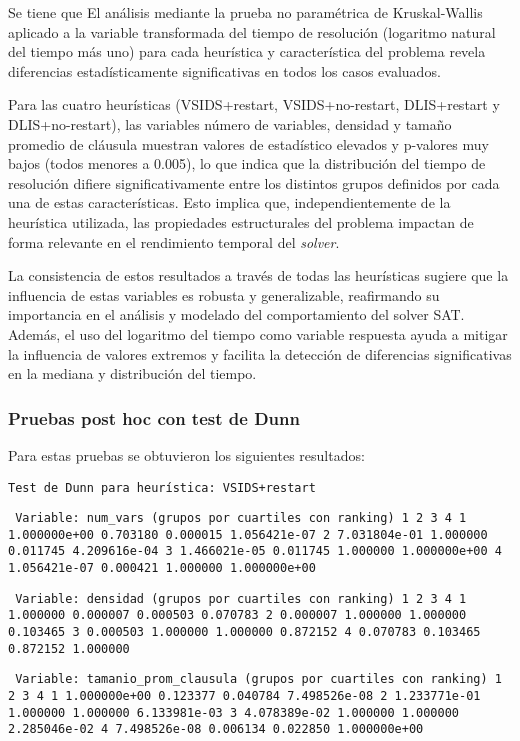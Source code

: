 Se tiene que El análisis mediante la prueba no paramétrica de Kruskal-Wallis aplicado a la variable transformada del tiempo de resolución (logaritmo natural del tiempo más uno) para cada heurística y característica del problema revela diferencias estadísticamente significativas en todos los casos evaluados.

Para las cuatro heurísticas (VSIDS+restart, VSIDS+no-restart, DLIS+restart y DLIS+no-restart), las variables número de variables, densidad y tamaño promedio de cláusula muestran valores de estadístico elevados y p-valores muy bajos (todos menores a 0.005), lo que indica que la distribución del tiempo de resolución difiere significativamente entre los distintos grupos definidos por cada una de estas características. Esto implica que, independientemente de la heurística utilizada, las propiedades estructurales del problema impactan de forma relevante en el rendimiento temporal del \textit{solver}.

La consistencia de estos resultados a través de todas las heurísticas sugiere que la influencia de estas variables es robusta y generalizable, reafirmando su importancia en el análisis y modelado del comportamiento del solver SAT. Además, el uso del logaritmo del tiempo como variable respuesta ayuda a mitigar la influencia de valores extremos y facilita la detección de diferencias significativas en la mediana y distribución del tiempo. 

\subsubsection{Pruebas post hoc con test de Dunn}

Para estas pruebas se obtuvieron los siguientes resultados:

\texttt{Test de Dunn para heurística: VSIDS+restart}

\texttt{
Variable: num\_vars (grupos por cuartiles con ranking)
              1         2         3             4
1  1.000000e+00  0.703180  0.000015  1.056421e-07
2  7.031804e-01  1.000000  0.011745  4.209616e-04
3  1.466021e-05  0.011745  1.000000  1.000000e+00
4  1.056421e-07  0.000421  1.000000  1.000000e+00}

\texttt{
Variable: densidad (grupos por cuartiles con ranking)
          1         2         3         4
1  1.000000  0.000007  0.000503  0.070783
2  0.000007  1.000000  1.000000  0.103465
3  0.000503  1.000000  1.000000  0.872152
4  0.070783  0.103465  0.872152  1.000000}

\texttt{
Variable: tamanio\_prom\_clausula (grupos por cuartiles con ranking)
              1         2         3             4
1  1.000000e+00  0.123377  0.040784  7.498526e-08
2  1.233771e-01  1.000000  1.000000  6.133981e-03
3  4.078389e-02  1.000000  1.000000  2.285046e-02
4  7.498526e-08  0.006134  0.022850  1.000000e+00}


